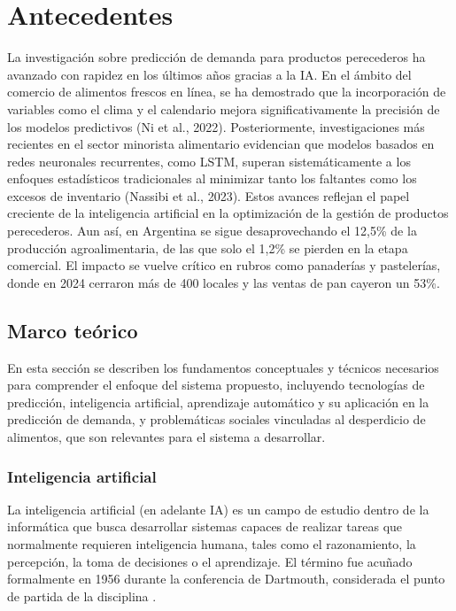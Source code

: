 \chapter{Antecedentes}\label{chapter02}

La investigación sobre predicción de demanda para productos perecederos ha avanzado con rapidez en los últimos años gracias a la IA. En el ámbito del comercio de alimentos frescos en línea, se ha demostrado que la incorporación de variables como el clima y el calendario mejora significativamente la precisión de los modelos predictivos (Ni et al., 2022). Posteriormente, investigaciones más recientes en el sector minorista alimentario evidencian que modelos basados en redes neuronales recurrentes, como LSTM, superan sistemáticamente a los enfoques estadísticos tradicionales al minimizar tanto los faltantes como los excesos de inventario (Nassibi et al., 2023). Estos avances reflejan el papel creciente de la inteligencia artificial en la optimización de la gestión de productos perecederos. Aun así, en Argentina se sigue desaprovechando el 12,5\% de la producción agroalimentaria, de las que solo el 1,2\% se pierden en la etapa comercial. El impacto se vuelve crítico en rubros como panaderías y pastelerías, donde en 2024 cerraron más de 400 locales y las ventas de pan cayeron un 53\%.


\section{Marco teórico}

En esta sección se describen los fundamentos conceptuales y técnicos necesarios para comprender el enfoque del sistema propuesto, incluyendo tecnologías de predicción, inteligencia artificial, aprendizaje automático y su aplicación en la predicción de demanda, y problemáticas sociales vinculadas al desperdicio de alimentos, que son relevantes para el sistema a desarrollar.


\subsection{Inteligencia artificial}

La inteligencia artificial (en adelante IA) es un campo de estudio dentro de la informática que busca desarrollar sistemas capaces de realizar tareas que normalmente requieren inteligencia humana, tales como el razonamiento, la percepción, la toma de decisiones o el aprendizaje. El término fue acuñado formalmente en 1956 durante la conferencia de Dartmouth, considerada el punto de partida de la disciplina \parencite{mccarthy1955}.\\

